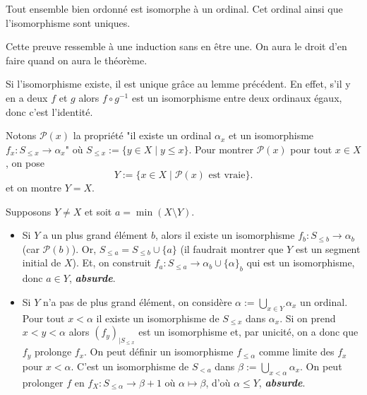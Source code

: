 \documentclass[./main]{subfiles}
\begin{document}
  \begin{thm}
    Tout ensemble bien ordonné est isomorphe à un ordinal. Cet ordinal ainsi que l'isomorphisme sont uniques.
  \end{thm}
  \begin{prv}
    Cette preuve ressemble à une induction sans en être une.
    On aura le droit d'en faire quand on aura le théorème.

    Si l'isomorphisme existe, il est unique grâce au lemme précédent.
    En effet, s'il y en a deux $f$ et $g$ alors $f \circ g^{-1}$ est un isomorphisme entre deux ordinaux égaux, donc c'est l'identité.

    Notons $\mathcal{P}(x)$ la propriété "il existe un ordinal $\alpha_x$ et un isomorphisme $f_x : S_{\le x} \to \alpha_x$" où $S_{\le x} := \{y \in X \mid y \le x\}$.
    Pour montrer $\mathcal{P}(x)$ pour tout $x \in X$, on pose  
    \[
    Y := \{x \in X  \mid \mathcal{P}(x) \text{ est vraie}\}
    .\] 
    et on montre $Y = X$.

    Supposons $Y \neq X$ et soit $a = \min (X \setminus Y)$.
    \begin{itemize}
      \item Si $Y$ a un plus grand élément $b$, alors il existe un isomorphisme $f_b : S_{\le b} \to \alpha_b$ (car $\mathcal{P}(b)$).
        Or, $S_{\le a} = S_{\le b} \cup \{a\}$ (il faudrait montrer que $Y$ est un segment initial de $X$).
        Et, on construit $f_a : S_{\le a} \to \alpha_b \cup \{\alpha\}_b$ qui est un isomorphisme, donc $a \in Y$, \textit{\textbf{absurde}}.
      \item Si $Y$ n'a pas de plus grand élément, on considère $\alpha := \bigcup_{x \in Y} \alpha_x$ un ordinal.
        Pour tout $x < \alpha$ il existe un isomorphisme de $S_{\le x}$ dans $\alpha_x$.
        Si on prend $x < y < \alpha$ alors  $(f_y)_{|S_{\le x}}$ est un isomorphisme et, par unicité, on a donc que $f_y$ prolonge $f_x$.
        On peut définir un isomorphisme $f_{\le \alpha}$ comme limite des $f_{x}$ pour $x < \alpha$.
        C'est un isomorphisme de $S_{< a}$ dans $\beta := \bigcup_{x < \alpha} \alpha_x$.
        On peut prolonger $f$ en $f_X : S_{\le \alpha} \to \beta + 1$ où $\alpha \mapsto \beta$, d'où $\alpha \le Y$, \textit{\textbf{absurde}}.
    \end{itemize}
  \end{prv}
\end{document}
